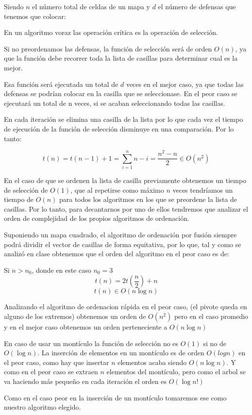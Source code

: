 Siendo $n$ el número total de celdas de un mapa y $d$ el número de defensas que tenemos que colocar:

En un algoritmo voraz las operación crítica es la operación de selección.

Si no preordenamos las defensas, la función de selección será de orden $O(n)$, ya que la función debe recorrer toda la lista de casillas para determinar cual es la mejor.

Esa función será ejecutada un total de $d$ veces en el mejor caso, ya que todas las defensas se podrían colocar en la casilla que se seleccionase.
En el peor caso se ejecutará un total de n veces, si se acaban seleccionando todas las casillas.

En cada iteración se elimina una casilla de la lista por lo que cada vez el tiempo de ejecución de la función de selección disminuye en una comparación.
Por lo tanto:

\[ t(n) = t(n-1) + 1 = \displaystyle\sum_{i=1}^{n}{n-i} = \frac{n^2 -n}{2} \in O(n^2) \]

En el caso de que se ordenen la lista de casilla previamente obtenemos un tiempo de selección de $O(1)$, que al repetirse como máximo $n$ veces tendríamos un tiempo de $O(n)$ para
todos los algoritmos en los que se preordene la lista de casillas.
Por lo tanto, para decantarnos por uno de ellos tendremos que analizar el orden de complejidad de los propios algoritmos de ordenación.

Suponiendo un mapa cuadrado, el algoritmo de ordenación por fusión siempre podrá dividir el vector de casillas de forma equitativa, por lo que, tal 
y como se analizó en clase obtenemos que el orden del algoritmo en el peor caso es de:

Si $n>n_0$, donde en este caso $n_0 = 3$
\[t(n) = 2t(\frac{n}{2})+n\] 
\[t(n) \in O(n\log{n})\]

Analizando el algoritmo de ordenacion rápida en el peor caso, (el pivote queda en alguno de los extremos) obtenemos un orden de $O(n^2)$
pero en el caso promedio y en el mejor caso obtenemos un orden perteneciente a $O(n\log{n})$

En caso de usar un montículo la función de selección no es $O(1)$ si no de $O(\log{n})$.
La inserción de elementos en un montículo es de orden $O(log{n})$ en el peor caso, como hay que insertar $n$ elementos acaba siendo $O(n\log{n})$.
Y como en el peor caso se extraen $n$ elementos del montículo, pero como el arbol se va haciendo más pequeño en cada iteración el orden es $O(\log{n!})$

Como en el caso peor en la inserción de un montículo tomaremos ese como nuestro algoritmo elegido.